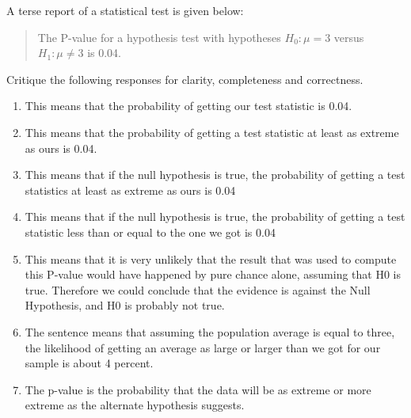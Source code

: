 A terse report of a statistical test is given below:


\begin{quote}


The P-value for a hypothesis test with hypotheses $H_0: \mu = 3$ versus $H_1: \mu \neq 3$ is 0.04.


\end{quote}





Critique the following responses for clarity, completeness and correctness.





\begin{enumerate} [leftmargin=1cm, itemsep=.2em]


\item This means that the probability of getting our test statistic is 0.04.





\item This means that the probability of getting a test statistic at least as extreme as ours is 0.04.





\item This means that if the null hypothesis is true, the probability of getting a test statistics at least as extreme as ours is 0.04





\item This means that if the null hypothesis is true, the probability of getting a test statistic less than or equal to the one we got is 0.04





\item This means that it is very unlikely that the result that was used to compute this P-value would have happened by pure chance alone, assuming that H0 is true. Therefore we could conclude that the evidence is against the Null Hypothesis, and H0 is probably not true.





\item The sentence means that assuming the population average is equal to three, the likelihood of getting an average as large or larger than we got for our sample is about 4 percent. 





\item The p-value is the probability that the data will be as extreme or more extreme as the alternate hypothesis suggests.


\end{enumerate}








